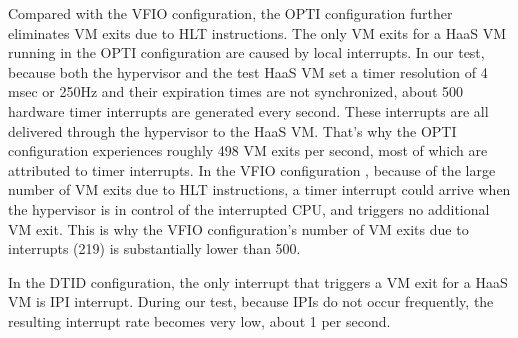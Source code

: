  Compared with the VFIO configuration, the OPTI configuration further eliminates VM exits due to HLT instructions.
 The only VM exits for a HaaS VM running in the OPTI configuration are caused by local interrupts.
 In our test, because both the hypervisor and the test HaaS VM set a timer 
 resolution of 4 msec or 250Hz and their expiration times
 are not synchronized, about 500 hardware timer interrupts are generated every second.
 These interrupts are all delivered through the hypervisor to the HaaS VM. That's why the OPTI configuration 
 experiences roughly 498 VM exits per second, most of which are attributed to timer interrupts.
 In the VFIO configuration , because of the large number of VM exits due to HLT instructions, a timer interrupt could arrive when the hypervisor is in control of the interrupted CPU, and triggers no additional VM exit.
 This is why the VFIO configuration's number of  VM exits  due to interrupts (219) is substantially lower than 500. 
  
In the DTID configuration, the only interrupt that triggers a VM exit for a HaaS VM is IPI interrupt. 
During our test, because IPIs do not occur frequently,  the resulting interrupt rate becomes very low, about 1 per second. 




